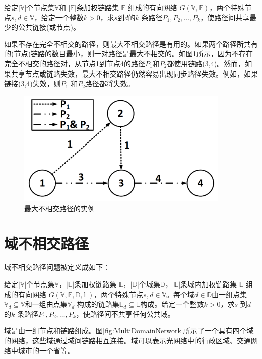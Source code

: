 \begin{definition}[最大不相交路径问题]
给定$|\mathbb{V}|$个节点集$\mathbb{V}$和 $|\mathbb{E}|$条加权链路集 $\mathbb{E}$ 组成的有向网络 $G(\mathbb{V},\mathbb{E})$，两个特殊节点$s,d\in\mathbb{V}$，给定一个整数$k>0$，求$s$到$d$的$k$ 条路径$P_1,P_2,\ldots,P_k$，使路径间共享最少的公共链接(或节点)。
\end{definition}
如果不存在完全不相交的路径，则最大不相交路径是有用的。如果两个路径所共有的(节点)链路的数目最小，则一对路径是最大不相交的。如图\ref{fig:MaximallyDisjointPaths}所示，因为不存在完全不相交的路径对，从节点1到节点4的路径$P_1$和$P_2$都使用链路(3,4)。然而，如果共享节点或链路失效，最大不相交路径仍然容易出现同步路径失效。例如，如果链接(3,4)失效，则$P_1$ 和$P_2$路径都将失效。
\begin{figure}[htbp]
  \centering
  \includegraphics[width=4.0in]{figures/MaximallyDisjointPaths}
  \caption{最大不相交路径的实例}
  \label{fig:MaximallyDisjointPaths}
\end{figure}

\section{域不相交路径}
域不相交路径问题被定义成如下：

\begin{definition}[域不相交路径问题]
给定$|\mathbb{V}|$个节点集$\mathbb{V}$，$|\mathbb{E}|$条加权链路集 $\mathbb{E}$，$|\mathbb{D}|$个域集$\mathbb{D}$，$|\mathbb{L}|$条域内加权链路集 $\mathbb{L}$ 组成的有向网络 $G(\mathbb{V},\mathbb{E},\mathbb{D},\mathbb{L})$，两个特殊节点$s,d\in\mathbb{V}$。每个域$d\in\mathbb{D}$由一组点集$\mathbb{V}_d\subseteq \mathbb{V}$和一组由点集$\mathbb{V}_d$ 构成的链路集$\mathbb{E}_d\subseteq \mathbb{E}$构成。给定一个整数$k>0$，求$s$ 到$d$ 的$k$ 条路径$P_1,P_2,\ldots,P_k$，使路径间不共享任何公共域。
\end{definition}

域是由一组节点和链路组成。图\ref{fig:MultiDomainNetwork}所示了一个具有四个域的网络，这些域通过域间链路相互连接。域可以表示光网络中的行政区域、交通网络中城市的一个省等。

